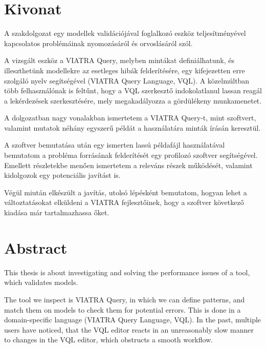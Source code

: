 \documentclass[11pt,a4paper,oneside]{report}
\begin{document}
\selectthesislanguage

\tableofcontents\cleardoublepage



\setcounter{page}{1}

\selecthungarian
\chapter*{Kivonat}
A szakdolgozat egy modellek validációjával foglalkozó eszköz teljesítményével
kapcsolatos problémáinak nyomozásáról és orvoslásáról szól.

A vizsgált eszköz a VIATRA Query, melyben mintákat definiálhatunk, és
illeszthetünk modellekre az esetleges hibák felderítésére, egy kifejezetten erre
szolgáló nyelv segítségével (VIATRA Query Language, VQL). A közelmúltban több
felhasználónak is feltűnt, hogy a VQL szerkesztő indokolatlanul lassan reagál
a lekérdezések szerkesztésére, mely megakadályozza a gördülékeny munkamenetet.

A dolgozatban nagy vonalakban ismertetem a VIATRA Query-t, mint szoftvert,
valamint mutatok néhány egyszerű példát a használatára minták írásán keresztül.

A szoftver bemutatása után egy ismerten lassú példafájl használatával bemutatom
a probléma forrásának felderítését egy profilozó szoftver segítségével. Emellett
részletekbe menően ismertetem a releváns részek működését, valamint kidolgozok
egy potenciális javítást is.

Végül miután elkészült a javítás, utolsó lépésként bemutatom, hogyan lehet a
változtatásokat elküldeni a VIATRA fejlesztőinek, hogy a szoftver következő
kiadása már tartalmazhassa őket.
\vfill

\selectenglish
\chapter*{Abstract}
This thesis is about investigating and solving the performance issues of a tool,
which validates models.

The tool we inspect is VIATRA Query, in which we can define patterns, and match
them on models to check them for potential errors. This is done in a
domain-specific language (VIATRA Query Language, VQL). In the past, multiple
users have noticed, that the VQL editor reacts in an unreasonably slow manner to
changes in the VQL editor, which obstructs a smooth workflow.
\end{document}
